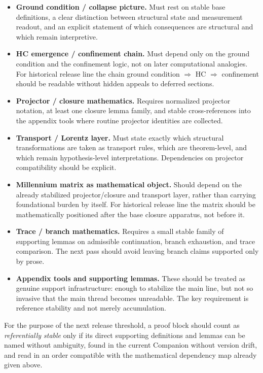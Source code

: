 \documentclass[12pt,a4paper]{article}
\DeclareRobustCommand{\QSCver}[1]{archival stage}
\renewcommand{\QSCver}[1]{historical release line}
\begin{document}
\begin{itemize}
 \item \textbf{Ground condition / collapse picture.} Must rest on stable base definitions, a clear distinction between structural state and measurement readout, and an explicit statement of which consequences are structural and which remain interpretive.
 \item \textbf{HC emergence / confinement chain.} Must depend only on the ground condition and the confinement logic, not on later computational analogies. For \QSCver{v2.27.0} the chain ground condition $\Rightarrow$ HC $\Rightarrow$ confinement should be readable without hidden appeals to deferred sections.
 \item \textbf{Projector / closure mathematics.} Requires normalized projector notation, at least one closure lemma family, and stable cross-references into the appendix tools where routine projector identities are collected.
 \item \textbf{Transport / Lorentz layer.} Must state exactly which structural transformations are taken as transport rules, which are theorem-level, and which remain hypothesis-level interpretations. Dependencies on projector compatibility should be explicit.
 \item \textbf{Millennium matrix as mathematical object.} Should depend on the already stabilized projector/closure and transport layer, rather than carrying foundational burden by itself. For \QSCver{v2.27.0} the matrix should be mathematically positioned after the base closure apparatus, not before it.
 \item \textbf{Trace / branch mathematics.} Requires a small stable family of supporting lemmas on admissible continuation, branch exhaustion, and trace comparison. The next pass should avoid leaving branch claims supported only by prose.
 \item \textbf{Appendix tools and supporting lemmas.} These should be treated as genuine support infrastructure: enough to stabilize the main line, but not so invasive that the main thread becomes unreadable. The key requirement is reference stability and not merely accumulation.
\end{itemize}

For the purpose of the next release threshold, a proof block should count as \emph{referentially stable} only if its direct supporting definitions and lemmas can be named without ambiguity, found in the current Companion without version drift, and read in an order compatible with the mathematical dependency map already given above.
\end{document}
